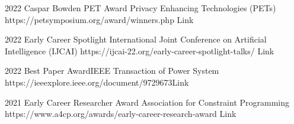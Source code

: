 \begin{awards}
	\awardentry
	{2022}
	{Caspar Bowden PET Award}%
	{Privacy Enhancing Technologies (PETs)}
	{https://petsymposium.org/award/winners.php}
	{Link}

	\awardentry
	{2022}
	{Early Career Spotlight}%
	{International Joint Conference on Artificial Intelligence (IJCAI)}
	{https://ijcai-22.org/early-career-spotlight-talks/}
	{Link}

	\awardentry
	{2022}
	{Best Paper Award}{IEEE Transaction of Power System}
	{https://ieeexplore.ieee.org/document/9729673}{Link}

	\awardentry
	{2021}
	{Early Career Researcher Award}
	{Association for Constraint Programming}
	{https://www.a4cp.org/awards/early-career-research-award}
	{Link}


\end{awards}
